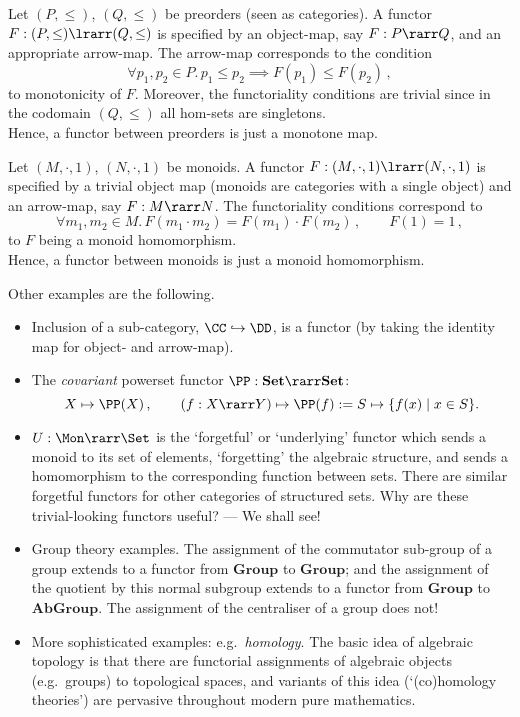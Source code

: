 \documentclass[12pt]{article}
\begin{document}
%
\begin{myexample}
Let $(P,\leq)$, $(Q,\leq)$ be preorders (seen as categories). A functor $F:(P,\leq)\lrarr(Q,\leq)$ is specified by an object-map, say $F:P\rarr Q$, and
an appropriate arrow-map. The arrow-map corresponds to the condition
\[ \forall p_1,p_2\in P.\, p_1\leq p_2 \implies F(p_1)\leq F(p_2)\,, \]
\ie to monotonicity of $F$. Moreover, the functoriality conditions are trivial since in the codomain $(Q,\leq)$ all hom-sets are singletons.\\
Hence, a functor between preorders is just a monotone map.
\end{myexample}
\begin{myexample}
Let $(M,\cdot,1)$, $(N,\cdot,1)$ be monoids. A functor $F:(M,\cdot,1)\lrarr(N,\cdot,1)$ is specified by a trivial object map (monoids are categories
with a single object) and an arrow-map, say $F:M\rarr N$. The functoriality conditions correspond to
\[ \forall m_1,m_2\in M.\, F(m_1\cdot m_2)=F(m_1)\cdot F(m_2)\,,\qquad F(1)=1\,,\]
\ie to $F$ being a monoid homomorphism.\\
Hence, a functor between monoids is just a monoid homomorphism.
\end{myexample}
%
Other examples are the following.
\begin{itemize}
\item Inclusion of a sub-category, $\CC\hookrightarrow\DD$, is a functor (by taking the identity map for object- and arrow-map).
\item The \emph{covariant} powerset functor $\PP:\mathbf{Set} \rarr \mathbf{Set}$:
\[ X \mapsto \PP(X)\,, \qquad (f : X \rarr Y) \mapsto \PP(f) := S \mapsto \{ f(x) \mid x \in S \} . \]
%
\item $U : \Mon \rarr \Set$ is the `forgetful' or `underlying' functor which sends a monoid to its set
  of elements, `forgetting' the algebraic structure, and sends a homomorphism to the corresponding function between sets. There are
  similar forgetful functors for other categories of structured sets. Why are these trivial-looking functors useful? --- We shall see!


\item Group theory examples. The assignment of the commutator sub-group of a group extends to a functor from $\textbf{Group}$ to $\textbf{Group}$;
    and the assignment of the quotient by this normal subgroup extends to a functor from $\textbf{Group}$ to $\textbf{AbGroup}$.
    The assignment of the centraliser of a group does not!
%
\item More sophisticated examples: e.g.~\emph{homology}. The basic idea of algebraic topology is that there are functorial assignments of algebraic objects (e.g.~groups) to topological spaces, and variants of this idea (`(co)homology theories') are pervasive throughout modern pure mathematics.
\end{itemize}
\end{document}
